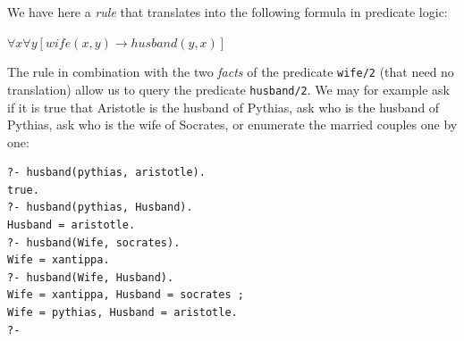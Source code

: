 \noindent We have here a \textit{rule} that translates into the following formula in predicate logic:

\begin{center}
$\forall x \forall y [wife(x,y) \rightarrow husband(y,x)]$
\end{center}

\noindent The rule in combination with the two \textit{facts} of the predicate \texttt{wife/2} (that need no translation) allow us to query the predicate \texttt{husband/2}. We may for example ask if it is true that Aristotle is the husband of Pythias, ask who is the husband of Pythias, ask who is the wife of Socrates, or enumerate the married couples one by one:

\begin{verbatim}
?- husband(pythias, aristotle).
true.
?- husband(pythias, Husband).
Husband = aristotle.
?- husband(Wife, socrates).
Wife = xantippa.
?- husband(Wife, Husband).
Wife = xantippa, Husband = socrates ;
Wife = pythias, Husband = aristotle.
?-
\end{verbatim}









